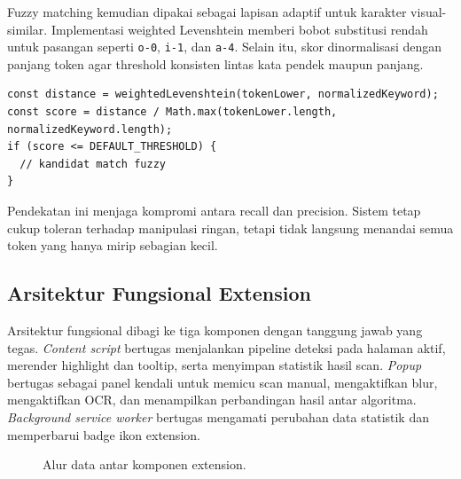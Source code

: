 Fuzzy matching kemudian dipakai sebagai lapisan adaptif untuk karakter visual-similar. Implementasi weighted Levenshtein memberi bobot substitusi rendah untuk pasangan seperti \texttt{o-0}, \texttt{i-1}, dan \texttt{a-4}. Selain itu, skor dinormalisasi dengan panjang token agar threshold konsisten lintas kata pendek maupun panjang.

\begin{lstlisting}[language={}, breaklines=true, breakatwhitespace=false, columns=fullflexible, caption={Cuplikan normalisasi skor fuzzy pada file src/algorithms/weightedLevenshtein.ts}]
const distance = weightedLevenshtein(tokenLower, normalizedKeyword);
const score = distance / Math.max(tokenLower.length, normalizedKeyword.length);
if (score <= DEFAULT_THRESHOLD) {
  // kandidat match fuzzy
}
\end{lstlisting}

Pendekatan ini menjaga kompromi antara recall dan precision. Sistem tetap cukup toleran terhadap manipulasi ringan, tetapi tidak langsung menandai semua token yang hanya mirip sebagian kecil.

\subsection{Arsitektur Fungsional Extension}

Arsitektur fungsional dibagi ke tiga komponen dengan tanggung jawab yang tegas. \textit{Content script} bertugas menjalankan pipeline deteksi pada halaman aktif, merender highlight dan tooltip, serta menyimpan statistik hasil scan. \textit{Popup} bertugas sebagai panel kendali untuk memicu scan manual, mengaktifkan blur, mengaktifkan OCR, dan menampilkan perbandingan hasil antar algoritma. \textit{Background service worker} bertugas mengamati perubahan data statistik dan memperbarui badge ikon extension.

\begin{figure}[H]
    \centering
    \caption{Alur data antar komponen extension.}
    \label{fig:alur-data-extension-bab3}
\end{figure}

